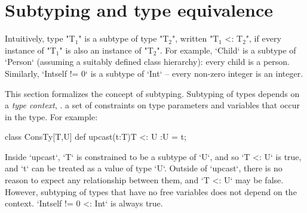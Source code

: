 \section{Subtyping and type equivalence}\label{DepType:Equivalence}

Intuitively, type \xcdmath"T$_1$" is a subtype of type \xcdmath"T$_2$", 
written \xcdmath"T$_1$ <: T$_2$", 
if
every instance of \xcdmath"T$_1$" is also an instance of \xcdmath"T$_2$".  For
example, \xcd`Child` is a subtype of \xcd`Person` (assuming a suitably defined
class hierarchy): every child is a person.  Similarly, \xcd`Int{self != 0}`
is a subtype of \xcd`Int` -- every non-zero integer is an integer.  

This section formalizes the concept of subtyping. Subtyping of types depends
on a {\em type context}, \viz. a set of constraints on type parameters
and variables that occur in the type.
For example: 

\begin{xten}
class ConsTy[T,U] {
   def upcast(t:T){T <: U} :U = t;
}
\end{xten}
%
\noindent
Inside \xcd`upcast`, \xcd`T` is constrained to be a subtype of \xcd`U`, and so
\xcd`T <: U` is true, and \xcd`t` can be treated as a value of type \xcd`U`.  
Outside of \xcd`upcast`, there is no reason to expect any relationship between
them, and \xcd`T <: U` may be false.
However, subtyping of types that have no free variables does not depend
on the context.    \xcd`Int{self != 0} <: Int` is always
true.




